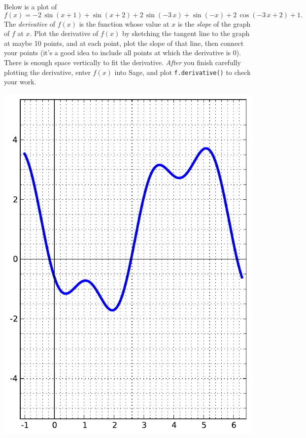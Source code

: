 Below is a plot of $$f(x)=-2 \, \sin\left(x + 1\right) + \sin\left(x + 2\right) + 2 \, \sin\left(-3 \, x\right) + \sin\left(-x\right) + 2 \, \cos\left(-3 \, x + 2\right) + 1.$$  The {\em \color{red}derivative} of $f(x)$ is the function whose value at $x$ is the {\em slope} of the graph of $f$ at $x$.  Plot the derivative of $f(x)$ by sketching the tangent line to the graph at maybe 10 points, and at each point, plot the slope of that line, then connect your points (it's a good idea to include all points at which the derivative is 0).  There is enough space vertically to fit the derivative.  {\em After} you finish carefully plotting the derivative, enter $f(x)$ into Sage, and plot {\color{blue}\verb|f.derivative()|} to check your work.
\begin{center}\includegraphics{functions/1.pdf}\end{center}\newpage

